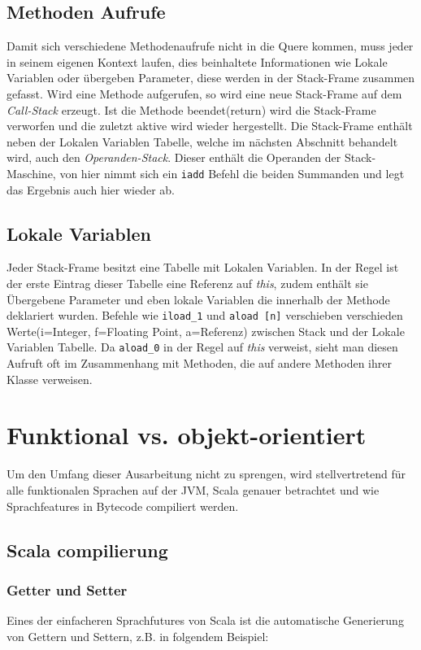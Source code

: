 \documentclass[a4paper, 11pt]{article}
\begin{document}
	\subsection{Methoden Aufrufe}
	Damit sich verschiedene Methodenaufrufe nicht in die Quere kommen, muss jeder in seinem eigenen Kontext laufen, dies beinhaltete Informationen wie Lokale Variablen oder übergeben Parameter, diese werden in der Stack-Frame zusammen gefasst. Wird eine Methode aufgerufen, so wird eine neue Stack-Frame auf dem \textit{Call-Stack} erzeugt. Ist die Methode beendet(return) wird die Stack-Frame verworfen und die zuletzt aktive wird wieder hergestellt. 
	Die Stack-Frame enthält neben der Lokalen Variablen Tabelle, welche im nächsten Abschnitt behandelt wird, auch den \textit{Operanden-Stack}. Dieser enthält die Operanden der Stack-Maschine, von hier nimmt sich ein \lstinline|iadd| Befehl die beiden Summanden und legt das Ergebnis auch hier wieder ab.
	
	
	\subsection{Lokale Variablen}
	Jeder Stack-Frame besitzt eine Tabelle mit Lokalen Variablen. In der Regel ist der erste Eintrag dieser Tabelle eine Referenz auf \textit{this}, zudem enthält sie Übergebene Parameter und eben lokale Variablen die innerhalb der Methode deklariert wurden. Befehle wie \lstinline|iload_1| und \lstinline|aload [n]| verschieben verschieden Werte(i=Integer, f=Floating Point, a=Referenz) zwischen Stack und der Lokale Variablen Tabelle. Da \lstinline|aload_0| in der Regel auf \textit{this} verweist, sieht man diesen Aufruft oft im Zusammenhang mit Methoden, die auf andere Methoden ihrer Klasse verweisen.
	

  \section{Funktional vs. objekt-orientiert}
  
  Um den Umfang dieser Ausarbeitung nicht zu sprengen, wird stellvertretend für alle funktionalen Sprachen auf der JVM, Scala genauer betrachtet und wie Sprachfeatures in Bytecode compiliert werden.
  
  \subsection{Scala compilierung}
	  \subsubsection{Getter und Setter}
		Eines der einfacheren Sprachfutures von Scala ist die automatische Generierung von Gettern und Settern, z.B. in folgendem Beispiel:
				
\end{document}
